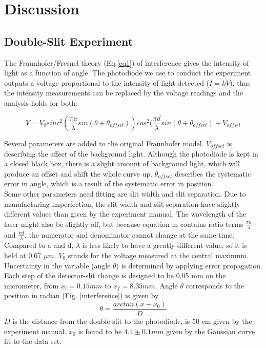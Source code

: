 \documentclass[prb,preprint]{revtex4-1}
\begin{document}
\section{Discussion}

\subsection{Double-Slit Experiment}

The Fraunhofer/Fresnel theory (Eq.\ref{eq1}) of interference gives the intensity of light as a function of angle. The photodiode we use to conduct the experiment outputs a voltage proportional to the intensity of light detected ($I = kV$), thus the intensity measurements can be replaced by the voltage readings and the analysis holds for both:

\begin{equation}
V=V_0 sinc^2( \frac{\pi a}{\lambda} sin (\theta+\theta_{offset}))  cos^2(\frac{\pi d}{\lambda} sin (\theta+\theta_{offset}) + V_{offset}
\label{fitdouble}
\end{equation}

Several parameters are added to the original Fraunhofer model. $V_{offset}$ is describing the affect of the background light. Although the photodiode is kept in a closed black box, there is a slight amount of background light, which will produce an offset and shift the whole curve up. $\theta_{offset}$ describes the systematic error in angle, which is a result of the systematic error in position.\\

Some other parameters need fitting are slit width and slit separation. Due to manufacturing imperfection, the slit width and slit separation have slightly different values than given by the experiment manual. The wavelength of the laser might also be slightly off, but because equation m contains ratio terms $\frac{\pi a}{\lambda}$ and $\frac{\pi d}{\lambda}$, the numerator and denominator cannot change at the same time. Compared to a and d, $\lambda$ is less likely to have a greatly different value, so it is held at 0.67 $\mu m$. $V_{0}$ stands for the voltage measured at the central maximum.\\

Uncertainty in the variable (angle $\theta$) is determined by applying error propagation. Each step of the detector-slit change is designed to be 0.05 mm on the micrometer, from $x_i = 0.15 mm$ to $x_f = 8.35 mm$. Angle $\theta$ corresponds to the position in radian (Fig. \ref{interference}) is given by
\begin{equation}
\theta = \frac{arctan(x-x_0)}{D}
\label{theta}
\end{equation}
$D$ is the distance from the double-slit to the photodiode, is 50 cm given by the experiment manual.
$x_0$ is found to be $4.4 \pm 0.1mm$ given by the Gaussian curve fit to the data set.
\end{document}
